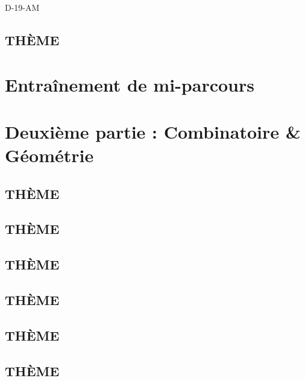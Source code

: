 \documentclass[poly,trombi]{valbonne}
\begin{document}
{D-19-AM}

\subsection{THÈME}


\section{Entraînement de mi-parcours}


\section{Deuxième partie : Combinatoire \& Géométrie}

\subsection{THÈME}


\subsection{THÈME}


\subsection{THÈME}


\subsection{THÈME}


\subsection{THÈME}


\subsection{THÈME}

\end{document}
